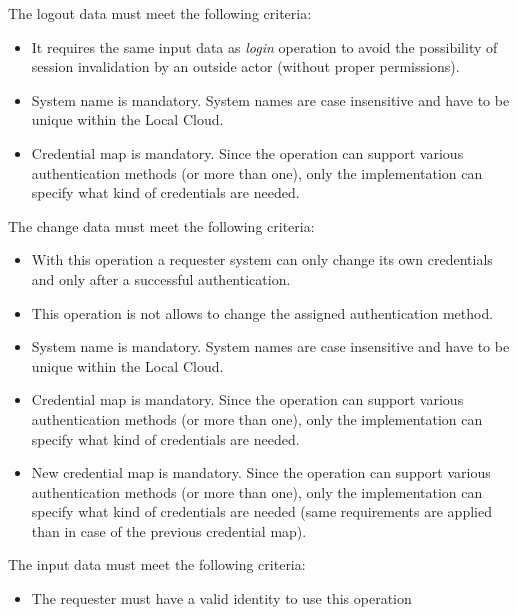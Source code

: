 \documentclass[a4paper]{arrowhead}
\begin{document}
The logout data must meet the following criteria:

\begin{itemize}
    \item It requires the same input data as \textit{login} operation to avoid the possibility of session invalidation by an outside actor (without proper permissions). 
    \item System name is mandatory. System names are case insensitive and have to be unique within the Local Cloud.
    \item Credential map is mandatory. Since the operation can support various authentication methods (or more than one), only the implementation can specify what kind of credentials are needed.
\end{itemize}


The change data must meet the following criteria:

\begin{itemize}
    \item With this operation a requester system can only change its own credentials and only after a successful authentication.
    \item This operation is not allows to change the assigned authentication method.
    \item System name is mandatory. System names are case insensitive and have to be unique within the Local Cloud.
    \item Credential map is mandatory. Since the operation can support various authentication methods (or more than one), only the implementation can specify what kind of credentials are needed.
    \item New credential map is mandatory. Since the operation can support various authentication methods (or more than one), only the implementation can specify what kind of credentials are needed (same requirements are applied than in case of the previous credential map). 
\end{itemize}


The input data must meet the following criteria:

\begin{itemize}
    \item The requester must have a valid identity to use this operation
\end{itemize}
\end{document}
